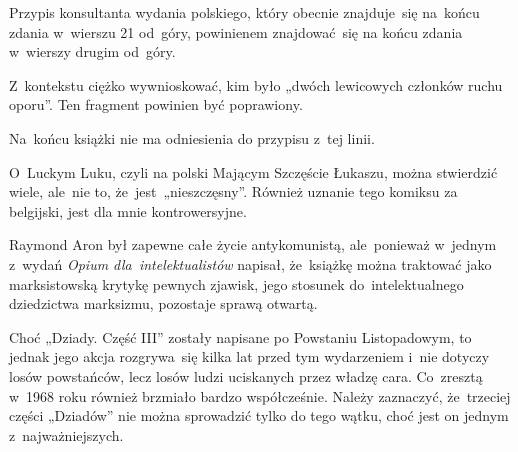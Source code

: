 \documentclass[a4paper,11pt]{article}
\numberwithin{equation}{section}
\begin{document}
\VerSpaceFour





\noindent
{} Przypis konsultanta wydania polskiego, który obecnie znajduje~się
na~końcu zdania w~wierszu 21 od~góry, powinienem znajdować~się na końcu
zdania w~wierszy drugim od~góry.

\VerSpaceFour





\noindent
{} Z~kontekstu ciężko wywnioskować, kim było „dwóch
lewicowych członków ruchu oporu”. Ten fragment powinien być poprawiony.

\VerSpaceFour





\noindent
{} Na~końcu książki nie ma odniesienia do przypisu z~tej
linii.

\VerSpaceFour





\noindent
{} O~Luckym Luku, czyli na polski Mającym Szczęście
Łukaszu, można stwierdzić wiele, ale~nie to, że~jest~„nieszczęsny”. Również
uznanie tego komiksu za belgijski, jest dla mnie kontrowersyjne.

\VerSpaceFour





\noindent
{} Raymond Aron był zapewne całe życie antykomunistą, ale~ponieważ
w~jednym z~wydań \textit{Opium dla~intelektualistów} napisał, że~książkę
można traktować jako marksistowską krytykę pewnych zjawisk, jego stosunek
do~intelektualnego dziedzictwa marksizmu, pozostaje sprawą otwartą.

\VerSpaceFour





\noindent
{} Choć „Dziady. Część III” zostały napisane po Powstaniu
Listopadowym, to jednak jego akcja rozgrywa~się kilka lat przed tym
wydarzeniem i~nie dotyczy losów powstańców, lecz losów ludzi uciskanych
przez władzę cara. Co~zresztą w~1968 roku również brzmiało bardzo
współcześnie. Należy zaznaczyć, że~trzeciej części „Dziadów” nie można
sprowadzić tylko do tego wątku, choć jest on jednym z~najważniejszych.

\VerSpaceFour
\end{document}
